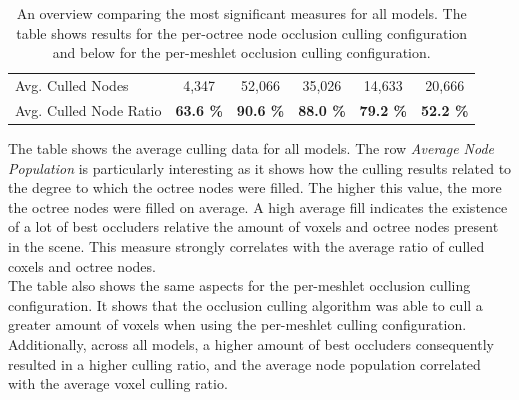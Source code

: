 \begin{table}[!htb]
\begin{tabular}{|lccccc|}
    \multicolumn{1}{|l|}{Avg. Culled Nodes}         & \multicolumn{1}{c|}{4,347}                    & \multicolumn{1}{c|}{52,066}                   & \multicolumn{1}{c|}{35,026}           & \multicolumn{1}{c|}{14,633}               & \multicolumn{1}{c|}{20,666}               \\
    \multicolumn{1}{|l|}{Avg. Culled Node Ratio}    & \multicolumn{1}{c|}{\textbf{63.6 \%}}         & \multicolumn{1}{c|}{\textbf{90.6 \%}}         & \multicolumn{1}{c|}{\textbf{88.0 \%}} & \multicolumn{1}{c|}{\textbf{79.2 \%}}     & \multicolumn{1}{c|}{\textbf{52.2 \%}}     \\ \hline
    
  \end{tabular}
  \caption{An overview comparing the most significant measures for all models. 
  The table shows results for the per-octree node occlusion culling configuration and below for the 
  per-meshlet occlusion culling configuration.}
  \label{tbl:culling-result-overview}
\end{table}
  
\noindent
The table shows the average culling data for all models. The row \emph{Average Node Population} is 
particularly interesting as it shows how the culling results related to the degree to which the octree 
nodes were filled. The higher this value, the more the octree nodes were filled on average. A high 
average fill indicates the existence of a lot of best occluders relative the amount of voxels and 
octree nodes present in the scene. This measure strongly correlates with the average ratio of culled 
coxels and octree nodes. \\

\noindent
The table also shows the same aspects for the per-meshlet occlusion culling configuration. It shows that the 
occlusion culling algorithm was able to cull a greater amount of voxels when using the per-meshlet culling 
configuration. Additionally, across all models, a higher amount of best occluders consequently resulted in a 
higher culling ratio, and the average node population correlated with the average voxel culling ratio.

